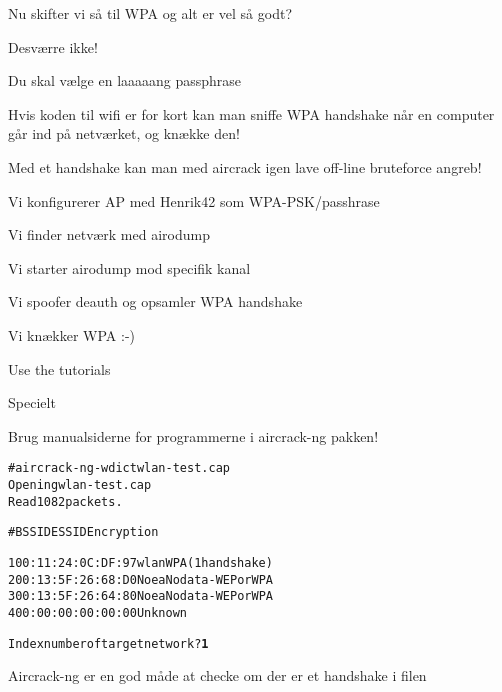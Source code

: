 \documentclass[Screen16to9,17pt]{foils}
\begin{document}

\begin{list1}
\item Nu skifter vi så til WPA og alt er vel så godt?
\pause
\item Desværre ikke!
\item Du skal vælge en laaaaang passphrase
\item Hvis koden til wifi er for kort kan man sniffe WPA
  handshake når en computer går ind på netværket, og knække den!
\item Med et handshake kan man med aircrack igen lave off-line
  bruteforce angreb!
\end{list1}


\begin{list1}
\item Vi konfigurerer AP med Henrik42 som WPA-PSK/passhrase
\item Vi finder netværk med airodump
\item Vi starter airodump mod specifik kanal
\item Vi spoofer deauth og opsamler WPA handshake
\item Vi knækker WPA :-)
\item Use the tutorials 
\item Specielt 

\end{list1}

\centerline{Brug manualsiderne for programmerne i aircrack-ng pakken!}


\begin{alltt}
\small
# aircrack-ng -w dict wlan-test.cap
Opening wlan-test.cap
Read 1082 packets.

#  BSSID              ESSID           Encryption

1  00:11:24:0C:DF:97  wlan            WPA (1 handshake)
2  00:13:5F:26:68:D0  Noea            No data - WEP or WPA
3  00:13:5F:26:64:80  Noea            No data - WEP or WPA
4  00:00:00:00:00:00                  Unknown

Index number of target network ? {\bf 1}
\end{alltt}

Aircrack-ng er en god måde at checke om der er et handshake i filen
\end{document}
